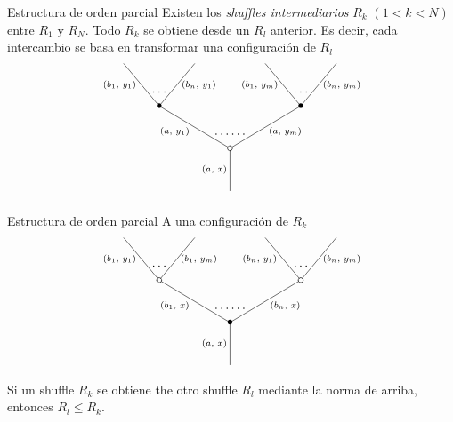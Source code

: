 \documentclass[12pt,aspectratio=169]{beamer}
\numberwithin{equation}{section}
\theoremstyle{definition}
\begin{document}
\begin{frame}{Estructura de orden parcial}
    Existen los \emph{shuffles intermediarios} $R_k$ $(1 < k < N)$ entre $R_1$ y $R_N$. %
Todo $R_k$ se obtiene desde un $R_l$ anterior. Es decir, cada intercambio se basa en transformar una configuraci\'on de $R_l$
\begin{equation}
    \xy
    <0.08cm, 0cm>:
    (0.0, 0.0)*{}="1"; %
    (0.0, 15.0)*\cir<2pt>{}="2"; %
    (-25.0, 30.0)*=0{\bullet}="3"; %
    (-37.5, 45.0)*{}="4"; %
    (-12.5, 45.0)*{}="5"; %
    (25.0, 30.0)*=0{\bullet}="6"; %
    (12.5, 45.0)*{}="7"; %
    (37.5, 45.0)*{}="8"; %
    "1";"2" **\dir{-};
    "2";"3" **\dir{-};
    "3";"4" **\dir{-};
    "3";"5" **\dir{-};
    "2";"6" **\dir{-};
    "6";"7" **\dir{-};
    "6";"8" **\dir{-};
    (-5.5, 7.5)*=0{\scriptstyle (a,\text{ }x)};
    (-19.5, 21)*=0{\scriptstyle (a,\text{ }y_1)};
    (-39, 37.5)*=0{\scriptstyle (b_1,\text{ }y_1)};
    (-11, 37.5)*=0{\scriptstyle (b_n,\text{ }y_1)};
    (19.5, 21)*=0{\scriptstyle (a,\text{ }y_m)};
    (10.5, 37.5)*=0{\scriptstyle (b_1,\text{ }y_m)};
    (39.5, 37.5)*=0{\scriptstyle (b_n,\text{ }y_m)};
    (-25,35)*{\dots};
    (25,35)*{\dots};
    (0,20)*{\dots\dots};
    \endxy
\end{equation}
\end{frame}
\begin{frame}{Estructura de orden parcial}
    A una configuraci\'on de $R_k$
\begin{equation}
    \xy
    <0.08cm, 0cm>:
    (0.0, 0.0)*{}="1"; %
    (0.0, 15.0)*=0{\bullet}="2"; %
    (-25.0, 30.0)*\cir<2pt>{}="3"; %
    (-37.5, 45.0)*{}="4"; %
    (-12.5, 45.0)*{}="5"; %
    (25.0, 30.0)*\cir<2pt>{}="6"; %
    (12.5, 45.0)*{}="7"; %
    (37.5, 45.0)*{}="8"; %
    "1";"2" **\dir{-};
    "2";"3" **\dir{-};
    "3";"4" **\dir{-};
    "3";"5" **\dir{-};
    "2";"6" **\dir{-};
    "6";"7" **\dir{-};
    "6";"8" **\dir{-};
    (-5.5, 7.5)*=0{\scriptstyle (a,\text{ }x)};
    (-19.5, 21)*=0{\scriptstyle (b_1,\text{ }x)};
    (-39, 37.5)*=0{\scriptstyle (b_1,\text{ }y_1)};
    (-11, 37.5)*=0{\scriptstyle (b_1,\text{ }y_m)};
    (19.5, 21)*=0{\scriptstyle (b_n,\text{ }x)};
    (10.5, 37.5)*=0{\scriptstyle (b_n,\text{ }y_1)};
    (39.5, 37.5)*=0{\scriptstyle (b_n,\text{ }y_m)};
    (-25,35)*{\dots};
    (25,35)*{\dots};
    (0,20)*{\dots\dots};
    \endxy
\end{equation}
Si un shuffle $R_k$ se obtiene the otro shuffle $R_l$ mediante la norma de arriba, entonces $R_l\le R_k$.
\end{frame}
\end{document}
